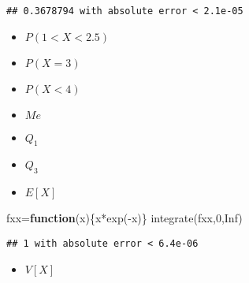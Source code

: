\documentclass[
]{article}
\newenvironment{Shaded}{\begin{snugshade}}{\end{snugshade}}
\newcommand{\CommentTok}[1]{\textcolor[rgb]{0.56,0.35,0.01}{\textit{#1}}}
\newcommand{\ConstantTok}[1]{\textcolor[rgb]{0.00,0.00,0.00}{#1}}
\newcommand{\ControlFlowTok}[1]{\textcolor[rgb]{0.13,0.29,0.53}{\textbf{#1}}}
\newcommand{\DecValTok}[1]{\textcolor[rgb]{0.00,0.00,0.81}{#1}}
\newcommand{\FunctionTok}[1]{\textcolor[rgb]{0.00,0.00,0.00}{#1}}
\newcommand{\NormalTok}[1]{#1}
\newcommand{\OtherTok}[1]{\textcolor[rgb]{0.56,0.35,0.01}{#1}}
\newcommand{\SpecialCharTok}[1]{\textcolor[rgb]{0.00,0.00,0.00}{#1}}
\providecommand{\tightlist}{%
  \setlength{\itemsep}{0pt}\setlength{\parskip}{0pt}}
\begin{document}
\begin{verbatim}
## 0.3678794 with absolute error < 2.1e-05
\end{verbatim}

\begin{itemize}
\item
  \(P(1 < X < 2.5)\)
\item
  \(P(X = 3)\)
\item
  \(P(X<4)\)
\item
  \(Me\)
\item
  \(Q_{1}\)
\item
  \(Q_{3}\)
\item
  \(E[X]\)
\end{itemize}

\begin{Shaded}
\begin{Highlighting}[]
\NormalTok{fxx}\OtherTok{=}\ControlFlowTok{function}\NormalTok{(x)\{x}\SpecialCharTok{*}\FunctionTok{exp}\NormalTok{(}\SpecialCharTok{{-}}\NormalTok{x)\}}
\FunctionTok{integrate}\NormalTok{(fxx,}\DecValTok{0}\NormalTok{,}\ConstantTok{Inf}\NormalTok{)}
\end{Highlighting}
\end{Shaded}

\begin{verbatim}
## 1 with absolute error < 6.4e-06
\end{verbatim}

\begin{itemize}
\tightlist
\item
  \(V[X]\)
\end{itemize}

\begin{Shaded}
\end{Shaded}
\end{document}
